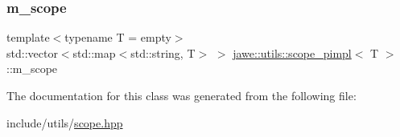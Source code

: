 \subsubsection{\texorpdfstring{m\+\_\+scope}{m\_scope}}
{\footnotesize\ttfamily template$<$typename T = empty$>$ \\
std\+::vector$<$std\+::map$<$std\+::string, T$>$ $>$ \hyperlink{classjawe_1_1utils_1_1scope__pimpl}{jawe\+::utils\+::scope\+\_\+pimpl}$<$ T $>$\+::m\+\_\+scope\hspace{0.3cm}{\ttfamily [private]}}



The documentation for this class was generated from the following file\+:\begin{DoxyCompactItemize}
\item 
include/utils/\hyperlink{scope_8hpp}{scope.\+hpp}\end{DoxyCompactItemize}
